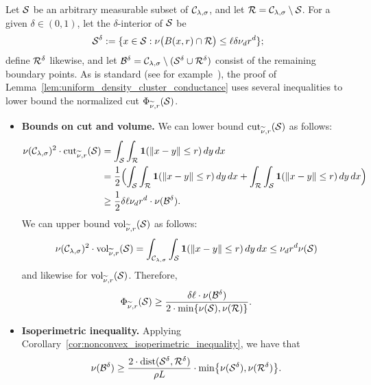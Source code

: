 	Let $\mathcal{S}$ be an arbitrary measurable subset of $\mathcal{C}_{\lambda,\sigma}$, and let $\mathcal{R} = \mathcal{C}_{\lambda,\sigma} \setminus \mathcal{S}$. For a given $\delta \in (0,1)$, let the $\delta$-interior of $\mathcal{S}$ be 
	\begin{equation*}
	\mathcal{S}^{\delta} := \{x \in \mathcal{S}: \nu\bigl(B(x,r) \cap \mathcal{R}\bigr) \leq \ell \delta \nu_d r^d\};
	\end{equation*}
	define $\mathcal{R}^{\delta}$ likewise, and let $\mathcal{B}^{\delta} = \mathcal{C}_{\lambda,\sigma} \setminus (\mathcal{S}^{\delta} \cup \mathcal{R}^{\delta})$ consist of the remaining boundary points.
	As is standard (see for example~\cite{dyer1991,lovasz1990}), the proof of Lemma~\ref{lem:uniform_density_cluster_conductance} uses several inequalities to lower bound the normalized cut $\Phi_{\widetilde{\nu},r}(\mathcal{S})$.
	\begin{itemize}
		\item \textbf{Bounds on cut and volume.}
		We can lower bound $\mathrm{cut}_{\widetilde{\nu},r}(\mathcal{S})$ as follows:
		\begin{align*}
		\nu(\mathcal{C}_{\lambda,\sigma})^2 \cdot \mathrm{cut}_{\widetilde{\nu},r}(\mathcal{S}) & = \int_{\mathcal{S}} \int_{\mathcal{R}} \mathbf{1}(\|x - y\| \leq r) \,dy \,dx \\
		& = \frac{1}{2}\Bigl(\int_{\mathcal{S}} \int_{\mathcal{R}} \mathbf{1}(\|x - y\| \leq r) \,dy \,dx + \int_{\mathcal{R}} \int_{\mathcal{S}} \mathbf{1}(\|x - y\| \leq r) \,dy \,dx\Bigr) \\
		& \geq \frac{1}{2} \delta \ell \nu_d r^d \cdot \nu(\mathcal{B}^{\delta}).
		\end{align*}
		We can upper bound $\mathrm{vol}_{\widetilde{\nu},r}(\mathcal{S})$ as follows:
		\begin{equation*}
		\nu(\mathcal{C}_{\lambda,\sigma})^2 \cdot \mathrm{vol}_{\widetilde{\nu},r}(\mathcal{S}) = \int_{\mathcal{C}_{\lambda,\sigma}} \int_{\mathcal{S}} \mathbf{1}(\|x - y\| \leq r) \,dy \,dx \leq \nu_d r^d \nu(\mathcal{S})
		\end{equation*}
		and likewise for $\mathrm{vol}_{\widetilde{\nu},r}(\mathcal{S})$. Therefore,
		\begin{equation}
		\label{pf:uniform_density_cluster_conductance_1}
		\Phi_{\widetilde{\nu},r}(\mathcal{S}) \geq \frac{\delta \ell \cdot \nu(\mathcal{B}^{\delta})}{2 \cdot \min\{\nu(\mathcal{S}), \nu(\mathcal{R})\}}.
		\end{equation}
		\item \textbf{Isoperimetric inequality.}
		Applying Corollary~\ref{cor:nonconvex_isoperimetric_inequality}, we have that
		\begin{equation}
		\label{pf:uniform_density_cluster_conductance_2}
		\nu(\mc{B}^{\delta}) \geq \frac{2 \cdot \mathrm{dist}(\mc{S}^{\delta},\mc{R}^{\delta})}{\rho L} \cdot \min\bigl\{\nu(\mc{S}^{\delta}),\nu(\mc{R}^{\delta})\bigr\}.

\end{equation}
\end{itemize}

